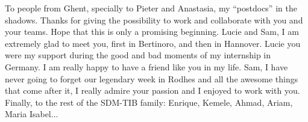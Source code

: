 \begin{acknowledgementslong}
To people from Ghent, specially to Pieter and Anastasia, my ``postdocs'' in the shadows. Thanks for giving the possibility to work and collaborate with you and your teams. Hope that this is only a promising beginning. Lucie and Sam, I am extremely glad to meet you, first in Bertinoro, and then in Hannover. Lucie you were my support during the good and bad moments of my internship in Germany. I am really happy to have a friend like you in my life. Sam, I have never going to forget our legendary week in Rodhes and all the awesome things that come after it, I really admire your passion and I enjoyed to work with you. Finally, to the rest of the SDM-TIB family: Enrique, Kemele, Ahmad, Ariam, Maria Isabel...




\end{acknowledgementslong}




